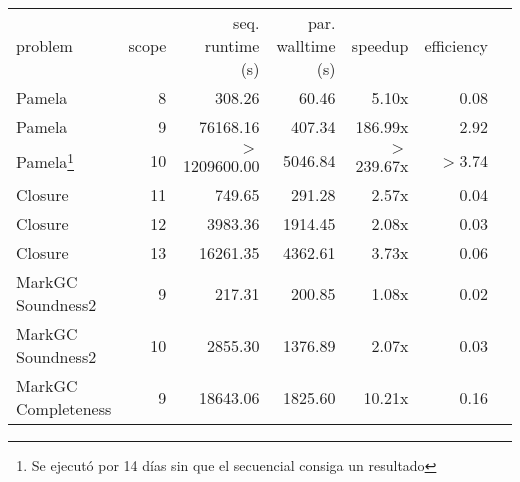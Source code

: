\hspace{-5em}
\begin{minipage}{\textwidth}
	\small
	\begin{tabular}{lrrrrrr}
		\toprule
		problem	&	scope	&	seq. runtime (s)	&	par. walltime (s)	&	speedup	&	efficiency \\
		\cmidrule(r){1-6}
		Pamela	&	8	&	308.26	&	60.46	&	5.10x	&	0.08 \\
		Pamela	&	9	&	76168.16	&	407.34	&	186.99x	&	2.92 \\
		Pamela\footnote{Se ejecutó por 14 días sin que el \ssolver secuencial consiga un resultado}	&	10	&	$>$1209600.00	&	5046.84	&	$>$239.67x	&	$>$3.74 \\
		\cmidrule(r){1-6}
		Closure	&	11	&	749.65	&	291.28	&	2.57x	&	0.04 \\
		Closure	&	12	&	3983.36	&	1914.45	&	2.08x	&	0.03 \\
		Closure	&	13	&	16261.35	&	4362.61	&	3.73x	&	0.06 \\
		\cmidrule(r){1-6}
		MarkGC Soundness2	&	9	&	217.31	&	200.85	&	1.08x	&	0.02 \\
		MarkGC Soundness2	&	10	&	2855.30	&	1376.89	&	2.07x	&	0.03 \\
		\cmidrule(r){1-6}
		MarkGC Completeness	&	9	&	18643.06	&	1825.60	&	10.21x	&	0.16 \\
		\bottomrule
	\end{tabular}
\end{minipage}
